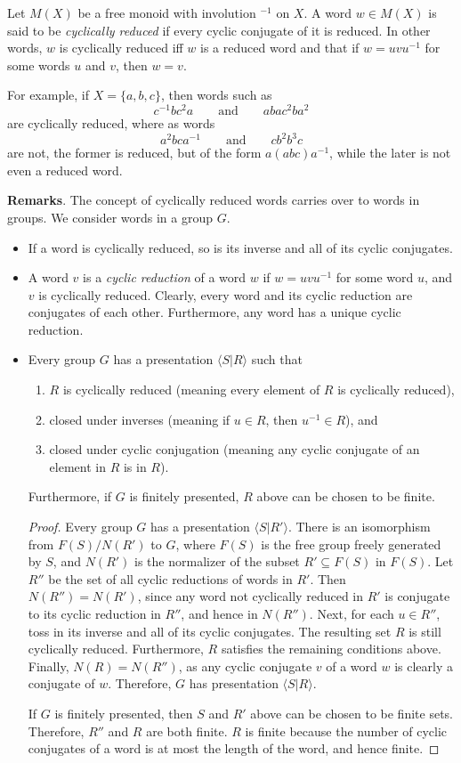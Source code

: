 \documentclass[12pt]{article}
\begin{document}
Let $M(X)$ be a free monoid with involution $^{-1}$ on $X$.  A word $w\in M(X)$ is said to be \emph{cyclically reduced} if every cyclic conjugate of it is reduced.  In other words, $w$ is cyclically reduced iff $w$ is a reduced word and that if $w=uvu^{-1}$ for some words $u$ and $v$, then $w=v$.

For example, if $X=\lbrace a,b,c\rbrace$, then words such as $$c^{-1}bc^2a\qquad\mbox{and}\qquad abac^2ba^2$$ are cyclically reduced, where as words $$a^2bca^{-1}\qquad\mbox{and}\qquad cb^2b^3c$$ are not, the former is reduced, but of the form $a(abc)a^{-1}$, while the later is not even a reduced word.

\textbf{Remarks}.  The concept of cyclically reduced words carries over to words in groups.  We consider words in a group $G$.
\begin{itemize}
\item If a word is cyclically reduced, so is its inverse and all of its cyclic conjugates.
\item A word $v$ is a \emph{cyclic reduction} of a word $w$ if $w=uvu^{-1}$ for some word $u$, and $v$ is cyclically reduced.  Clearly, every word and its cyclic reduction are conjugates of each other.  Furthermore, any word has a unique cyclic reduction. 
\item Every group $G$ has a presentation $\langle S| R\rangle$ such that 
\begin{enumerate}
\item $R$ is cyclically reduced (meaning every element of $R$ is cyclically reduced),
\item closed under inverses (meaning if $u\in R$, then $u^{-1}\in R$), and 
\item closed under cyclic conjugation (meaning any cyclic conjugate of an element in $R$ is in $R$).
\end{enumerate}
Furthermore, if $G$ is finitely presented, $R$ above can be chosen to be finite.
\begin{proof}  Every group $G$ has a presentation $\langle S| R'\rangle$.  There is an isomorphism from $F(S)/N(R')$ to $G$, where $F(S)$ is the free group freely generated by $S$, and $N(R')$ is the normalizer of the subset $R'\subseteq F(S)$ in $F(S)$.  Let $R''$ be the set of all cyclic reductions of words in $R'$.  Then $N(R'')=N(R')$, since any word not cyclically reduced in $R'$ is conjugate to its cyclic reduction in $R''$, and hence in $N(R'')$.  Next, for each $u\in R''$, toss in its inverse and all of its cyclic conjugates.  The resulting set $R$ is still cyclically reduced.  Furthermore, $R$ satisfies the remaining conditions above.  Finally, $N(R)=N(R'')$, as any cyclic conjugate $v$ of a word $w$ is clearly a conjugate of $w$.  Therefore, $G$ has presentation $\langle S| R\rangle$.

If $G$ is finitely presented, then $S$ and $R'$ above can be chosen to be finite sets.  Therefore, $R''$ and $R$ are both finite.  $R$ is finite because the number of cyclic conjugates of a word is at most the length of the word, and hence finite.
\end{proof}
\end{itemize}
\end{document}
